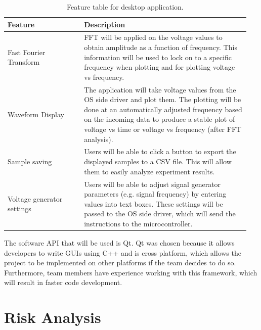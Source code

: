 \documentclass[letterpaper,12pt]{article}
\begin{document}
\begin{table}[h!]
    \centering
    \caption{Feature table for desktop application.}
    \begin{tabular}{||p{0.3\linewidth} p{0.65\linewidth}||} 
    \hline
    Feature & Description \\ [0.5ex] 
    \hline\hline
    Fast Fourier Transform &        FFT will be applied on the voltage values to obtain amplitude as a function 
                                    of frequency. This information will be used to lock on to a specific frequency 
                                    when plotting and for plotting voltage vs frequency. \\[30pt]
    Waveform Display &              The application will take voltage values from the OS side driver and 
                                    plot them. The plotting will be done at an automatically adjusted frequency 
                                    based on the incoming data to produce a stable plot of voltage vs time or 
                                    voltage vs frequency (after FFT analysis). \\[44pt]
    Sample saving &                 Users will be able to click a button to export the displayed samples to a CSV file. This 
                                    will allow them to easily analyze experiment results. \\[20pt]
    Voltage generator settings &    Users will be able to adjust signal generator parameters (e.g. signal 
                                    frequency) by entering values into text boxes. These settings will be 
                                    passed to the OS side driver, which will send the instructions to the 
                                    microcontroller. \\ [1ex] 
    \hline
    \end{tabular}
\end{table} 

\noindent
The software API that will be used is Qt. Qt was chosen because it allows
developers to write GUIs using C++ and is cross platform, which allows the
project to be implemented on other platforms if the team decides to do so.
Furthermore, team members have experience working with this framework, which
will result in faster code development.

\section{Risk Analysis} %
\end{document}
